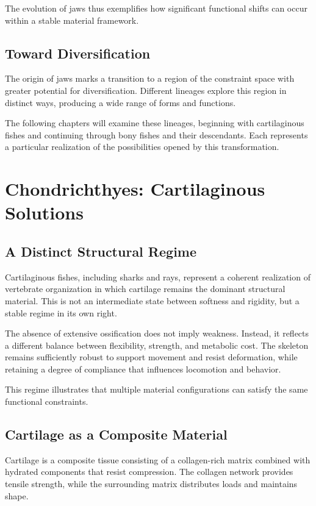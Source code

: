 \documentclass[11pt,oneside]{book}
\begin{document}
The evolution of jaws thus exemplifies how significant functional shifts can occur within a stable material framework.

\section{Toward Diversification}

The origin of jaws marks a transition to a region of the constraint space with greater potential for diversification. Different lineages explore this region in distinct ways, producing a wide range of forms and functions.

The following chapters will examine these lineages, beginning with cartilaginous fishes and continuing through bony fishes and their descendants. Each represents a particular realization of the possibilities opened by this transformation.

\chapter{Chondrichthyes: Cartilaginous Solutions}

\section{A Distinct Structural Regime}

Cartilaginous fishes, including sharks and rays, represent a coherent realization of vertebrate organization in which cartilage remains the dominant structural material. This is not an intermediate state between softness and rigidity, but a stable regime in its own right.

The absence of extensive ossification does not imply weakness. Instead, it reflects a different balance between flexibility, strength, and metabolic cost. The skeleton remains sufficiently robust to support movement and resist deformation, while retaining a degree of compliance that influences locomotion and behavior.

This regime illustrates that multiple material configurations can satisfy the same functional constraints.

\section{Cartilage as a Composite Material}

Cartilage is a composite tissue consisting of a collagen-rich matrix combined with hydrated components that resist compression. The collagen network provides tensile strength, while the surrounding matrix distributes loads and maintains shape.
\end{document}
